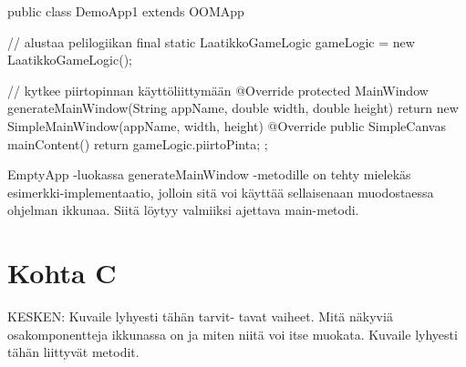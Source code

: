 \begin{javacode}
public class DemoApp1 extends OOMApp {
    // alustaa pelilogiikan
    final static LaatikkoGameLogic gameLogic = new LaatikkoGameLogic();

    // kytkee piirtopinnan käyttöliittymään
    @Override
    protected MainWindow generateMainWindow(String appName, double width, double height) {
        return new SimpleMainWindow(appName, width, height) {
            @Override public SimpleCanvas mainContent() {
                return gameLogic.piirtoPinta;
            }
        };
    }
}
\end{javacode}

EmptyApp -luokassa generateMainWindow -metodille on tehty mielekäs
esimerkki-implementaatio, jolloin sitä voi käyttää sellaisenaan muodostaessa
ohjelman ikkunaa. Siitä löytyy valmiiksi ajettava main-metodi.

\section{Kohta C}

\label{Kohta C}

KESKEN:
Kuvaile lyhyesti tähän tarvit- tavat vaiheet. Mitä näkyviä osakomponentteja ikkunassa on ja miten niitä voi itse muokata. Kuvaile lyhyesti
tähän liittyvät metodit.

